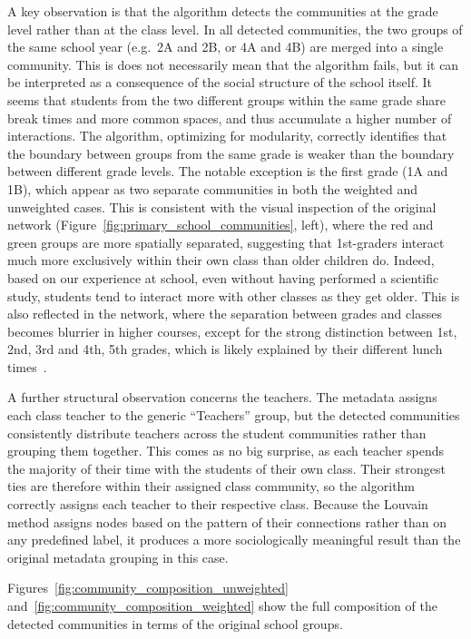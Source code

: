 \documentclass{article}
\begin{document}
A key observation is that the algorithm detects the communities at the grade level rather than at the class level. In all detected communities, the two groups of the same school year (e.g.\ 2A and 2B, or 4A and 4B) are merged into a single community. This is does not necessarily mean that the algorithm fails, but it can be interpreted as a consequence of the social structure of the school itself. It seems that students from the two different groups within the same grade share break times and more common spaces, and thus accumulate a higher number of interactions. The algorithm, optimizing for modularity, correctly identifies that the boundary between groups from the same grade is weaker than the boundary between different grade levels. The notable exception is the first grade (1A and 1B), which appear as two separate communities in both the weighted and unweighted cases. This is consistent with the visual inspection of the original network (Figure~\ref{fig:primary_school_communities}, left), where the red and green groups are more spatially separated, suggesting that 1st-graders interact much more exclusively within their own class than older children do. Indeed, based on our experience at school, even without having performed a scientific study, students tend to interact more with other classes as they get older. This is also reflected in the network, where the separation between grades and classes becomes blurrier in higher courses, except for the strong distinction between 1st, 2nd, 3rd and 4th, 5th grades, which is likely explained by their different lunch times~\cite{stehle2011high}.
 
A further structural observation concerns the teachers. The metadata assigns each class teacher to the generic ``Teachers'' group, but the detected communities consistently distribute teachers across the student communities rather than grouping them together. This comes as no big surprise, as each teacher spends the majority of their time with the students of their own class. Their strongest ties are therefore within their assigned class community, so the algorithm correctly assigns each teacher to their respective class. Because the Louvain method assigns nodes based on the pattern of their connections rather than on any predefined label, it produces a more sociologically meaningful result than the original metadata grouping in this case.
 
Figures~\ref{fig:community_composition_unweighted} and~\ref{fig:community_composition_weighted} show the full composition of the detected communities in terms of the original school groups.
 
\end{document}
